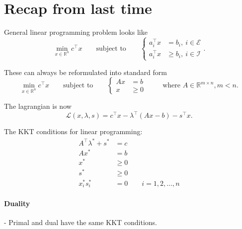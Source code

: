 \documentclass{article}
\begin{document}
\maketitle

\section{Recap from last time}

General linear programming problem looks like
\[
  \min_{x\in \mathbb{R}^{n}} c^{\top}x \qquad \text{subject to}  \qquad \left\{
  \begin{aligned}
    a_i^{\top}x & = b_i,\ i\in \mathcal{E}    \\
    a_i^{\top}x & \geq b_i,\ i\in \mathcal{I}
  \end{aligned}
  \right.
  .\]

These can always be reformulated into standard form
\[
  \min_{x\in \mathbb{R}^{n}}c^{\top}x \qquad \text{subject to} \qquad \left\{
  \begin{aligned}
    Ax & = b    \\
    x  & \geq 0
  \end{aligned}
  \right. \qquad \text{ where } A\in\mathbb{R}^{m \times n}, m < n
  .\]

The lagrangian is now
\[
  \mathcal{L}(x, \lambda, s) = c^{\top}x - \lambda^{\top}(Ax - b) - s^{\top}x
  .\]

The KKT conditions for linear programming:
\begin{align*}
  A^{\top}\lambda^* + s^* & = c                         \\
  Ax^*                    & = b                         \\
  x^*                     & \geq 0                      \\
  s^*                     & \geq 0                      \\
  x_i^*s_i ^*             & = 0 \qquad i = 1,2 ,\dots,n
\end{align*}

\paragraph{Duality}- Primal and dual have the same KKT conditions.
\end{document}
